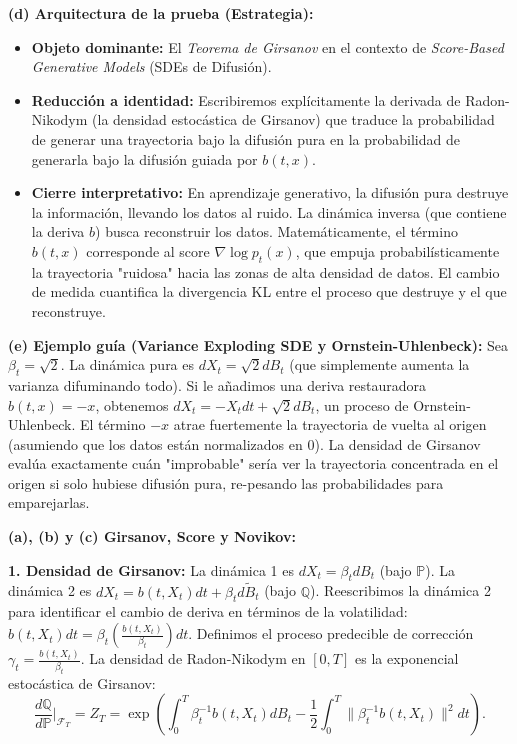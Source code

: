 \documentclass[11pt, letterpaper]{article}
\begin{document}
\begin{solucion}
    \textbf{(d) Arquitectura de la prueba (Estrategia):}
    \begin{itemize}
        \item[(i)] \textbf{Objeto dominante:} El \textit{Teorema de Girsanov} en el contexto de \textit{Score-Based Generative Models} (SDEs de Difusión).
        \item[(ii)] \textbf{Reducción a identidad:} Escribiremos explícitamente la derivada de Radon-Nikodym (la densidad estocástica de Girsanov) que traduce la probabilidad de generar una trayectoria bajo la difusión pura en la probabilidad de generarla bajo la difusión guiada por $b(t,x)$.
        \item[(iii)] \textbf{Cierre interpretativo:} En aprendizaje generativo, la difusión pura destruye la información, llevando los datos al ruido. La dinámica inversa (que contiene la deriva $b$) busca reconstruir los datos. Matemáticamente, el término $b(t, x)$ corresponde al score $\nabla \log p_t(x)$, que empuja probabilísticamente la trayectoria "ruidosa" hacia las zonas de alta densidad de datos. El cambio de medida cuantifica la divergencia KL entre el proceso que destruye y el que reconstruye.
    \end{itemize}

    \vspace{3mm}
    \textbf{(e) Ejemplo guía (Variance Exploding SDE y Ornstein-Uhlenbeck):}
    Sea $\beta_t = \sqrt{2}$. La dinámica pura es $dX_t = \sqrt{2} dB_t$ (que simplemente aumenta la varianza difuminando todo).
    Si le añadimos una deriva restauradora $b(t, x) = -x$, obtenemos $dX_t = -X_t dt + \sqrt{2} dB_t$, un proceso de Ornstein-Uhlenbeck. El término $-x$ atrae fuertemente la trayectoria de vuelta al origen (asumiendo que los datos están normalizados en 0). La densidad de Girsanov evalúa exactamente cuán "improbable" sería ver la trayectoria concentrada en el origen si solo hubiese difusión pura, re-pesando las probabilidades para emparejarlas.

    \textbf{(a), (b) y (c) Girsanov, Score y Novikov:}

    \textbf{1. Densidad de Girsanov:}
    La dinámica 1 es $dX_t = \beta_t dB_t$ (bajo $\mathbb{P}$). La dinámica 2 es $dX_t = b(t, X_t) dt + \beta_t d\tilde{B}_t$ (bajo $\mathbb{Q}$).
    Reescribimos la dinámica 2 para identificar el cambio de deriva en términos de la volatilidad:
    $b(t, X_t) dt = \beta_t \left( \frac{b(t, X_t)}{\beta_t} \right) dt$.
    Definimos el proceso predecible de corrección $\gamma_t = \frac{b(t, X_t)}{\beta_t}$.
    La densidad de Radon-Nikodym en $[0, T]$ es la exponencial estocástica de Girsanov:
    \[ \frac{d\mathbb{Q}}{d\mathbb{P}}\Bigg|_{\mathcal{F}_T} = Z_T = \exp\left( \int_0^T \beta_t^{-1} b(t, X_t) dB_t - \frac{1}{2} \int_0^T \|\beta_t^{-1} b(t, X_t)\|^2 dt \right). \]


\end{solucion}
\end{document}
